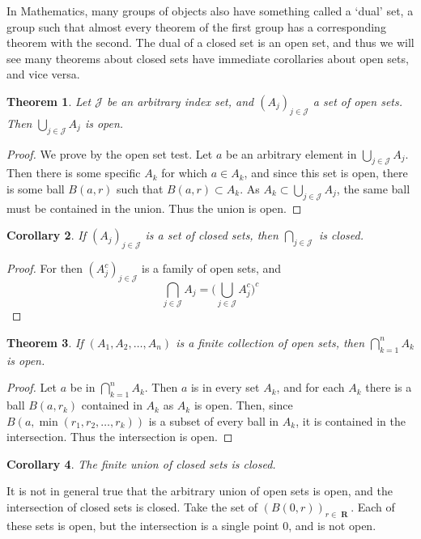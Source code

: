 \documentclass{report}
\newtheorem{theorem}{Theorem}[chapter]
\newtheorem{corollary}[theorem]{Corollary}
\DeclareMathOperator{\real}{\mathbf{R}}
\begin{document}
In Mathematics, many groups of objects also have something called a `dual' set, a group such that almost every theorem of the first group has a corresponding theorem with the second. The dual of a closed set is an open set, and thus we will see many theorems about closed sets have immediate corollaries about open sets, and vice versa.

\begin{theorem}
  Let $\mathcal{J}$ be an arbitrary index set, and $(A_j)_{j \in \mathcal{J}}$ a set of open sets. Then $\bigcup_{j \in \mathcal{J}} A_j$ is open.
\end{theorem}
\begin{proof}
  We prove by the open set test. Let $a$ be an arbitrary element in $\bigcup_{j \in \mathcal{J}} A_j$. Then there is some specific $A_k$ for which $a \in A_k$, and since this set is open, there is some ball $B(a,r)$ such that $B(a,r) \subset A_k$. As $A_k \subset \bigcup_{j \in \mathcal{J}} A_j$, the same ball must be contained in the union. Thus the union is open.
\end{proof}

\begin{corollary}
  If $(A_j)_{j \in \mathcal{J}}$ is a set of closed sets, then $\bigcap_{j \in \mathcal{J}}$ is closed.
\end{corollary}
\begin{proof}
  For then $(A_j^c)_{j \in \mathcal{J}}$ is a family of open sets, and
  \[ \bigcap_{j \in \mathcal{J}} A_j = \bigg( \bigcup_{j \in \mathcal{J}} A_j^c \bigg)^c \]
\end{proof}

\begin{theorem}
  If $(A_1, A_2, \dots, A_n)$ is a finite collection of open sets, then $\bigcap_{k = 1}^n A_k$ is open.
\end{theorem}
\begin{proof}
  Let $a$ be in $\bigcap_{k = 1}^n A_k$. Then $a$ is in every set $A_k$, and for each $A_k$ there is a ball $B(a,r_k)$ contained in $A_k$ as $A_k$ is open. Then, since $B(a,\min(r_1,r_2, \dots, r_k))$ is a subset of every ball in $A_k$, it is contained in the intersection. Thus the intersection is open.
\end{proof}

\begin{corollary}
  The finite union of closed sets is closed.
\end{corollary}

It is not in general true that the arbitrary union of open sets is open, and the intersection of closed sets is closed. Take the set of $(B(0,r))_{r \in \real}$. Each of these sets is open, but the intersection is a single point 0, and is not open.
\end{document}
